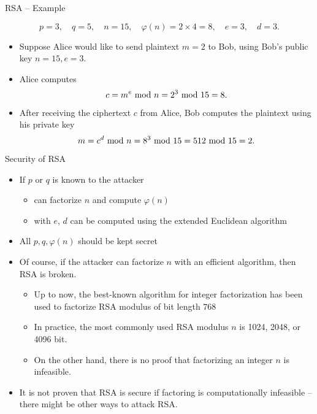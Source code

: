 \begin{frame}{RSA -- Example}
\begin{example}
\[
p=3,\quad q=5,\quad n=15,\quad \varphi(n)=2\times4=8,\quad e=3,\quad d=3.
\]
\begin{itemize}
    \item Suppose Alice would like to send plaintext $m=2$ to Bob, using Bob's public key $n=15,e=3$.
    \item Alice computes 
\[
c=m^e\textrm{~mod~} n=2^3\textrm{~mod~}15=8.
\]
\item After receiving the ciphertext $c$ from Alice, Bob computes the plaintext using his private key 
\[
m=c^d\textrm{~mod~} n=8^3\textrm{~mod~}15=512\textrm{~mod~}15=2.
\]
\end{itemize}
\end{example}
\end{frame}

\begin{frame}{Security of RSA}
    \begin{itemize}
        \item If $p$ or $q$ is known to the attacker
        \begin{itemize}
            \item can factorize $n$ and compute $\varphi(n)$
            \item with $e$, $d$ can be computed using the extended Euclidean algorithm 
        \end{itemize}
        \item All $p,q,\varphi(n)$ should be kept secret
        \item Of course, if the attacker can factorize $n$ with an efficient algorithm, then RSA is broken.
        \begin{itemize}
            \item Up to now, the best-known algorithm for integer factorization has been used to factorize RSA modulus of bit length $768$
            \item In practice, the most commonly used RSA modulus $n$ is 1024, 2048, or 4096 bit.
            \item On the other hand, there is no proof that factorizing an integer $n$ is infeasible.
        \end{itemize}
         \item It is not proven that RSA is secure if factoring is computationally infeasible -- there might be other ways to attack RSA.
    \end{itemize}
\end{frame}

